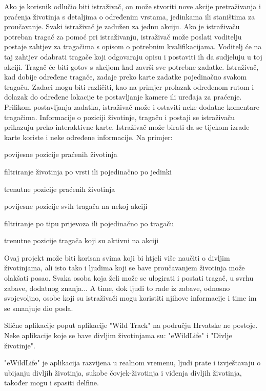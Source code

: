 	Ako je korisnik odlučio biti istraživač, on može stvoriti nove akcije pretraživanja i praćenja životinja s detaljima o određenim vrstama, jedinkama ili staništima za proučavanje.
	Svaki istraživač je zadužen za jednu akciju.
	Ako je istraživaču potreban tragač za pomoć pri istraživanju, istraživač može poslati voditelju postaje zahtjev za tragačima s opisom o potrebnim kvalifikacijama.
	Voditelj će na taj zahtjev odabrati tragače koji odgovaraju opisu i postaviti ih da sudjeluju u toj akciji.
	Tragač će biti gotov s akcijom kad završi sve potrebne zadatke.
	Istraživač, kad dobije određene tragače, zadaje preko karte zadatke pojedinačno svakom tragaču.
	Zadaci mogu biti različiti, kao na primjer prolazak određenom rutom i dolazak do određene lokacije te postavljanje kamere ili uređaja za praćenje.
	Prilikom postavljanja zadatka, istraživač može i ostaviti neke dodatne komentare tragačima.
	Informacije o poziciji životinje, tragaču i postaji se istraživaču prikazuju preko interaktivne karte.
	Istraživač može birati da se tijekom izrade karte koriste i neke određene informacije. Na primjer:
	\begin{packed_item}
		\item povijesne pozicije praćenih životinja
		\item filtriranje životinja po vrsti ili pojedinačno po jedinki
		\item trenutne pozicije praćenih životinja
		\item povijesne pozicije svih tragača na nekoj akciji
		\item filtriranje po tipu prijevoza ili pojedinačno po tragaču
		\item trenutne pozicije tragača koji su aktivni na akciji
	\end{packed_item}


	

	Ovaj projekt može biti korisan svima koji bi htjeli više naučiti o divljim životinjama, ali isto tako i ljudima koji se bave proučavanjem životinja može olakšati posao.
	Svaka osoba koja želi može se ulogirati i postati tragač, u svrhu zabave, dodatnog znanja... A time, dok ljudi to rade iz zabave, odnosno svojevoljno, osobe koji su istraživači 
	mogu koristiti njihove informacije i time im se smanjuje dio posla.

	Slične aplikacije poput aplikacije "Wild Track" na području Hrvatske ne postoje. Neke aplikacije koje se bave divljim životinjama su: "eWildLife" i "Divlje životinje".

	"eWildLife" je aplikacija razvijena u realnom vremenu, ljudi prate i izvještavaju o ubijanju divljih životinja, 
	sukobe čovjek-životinja i viđenja divljih životinja, također mogu i spasiti delfine. 

